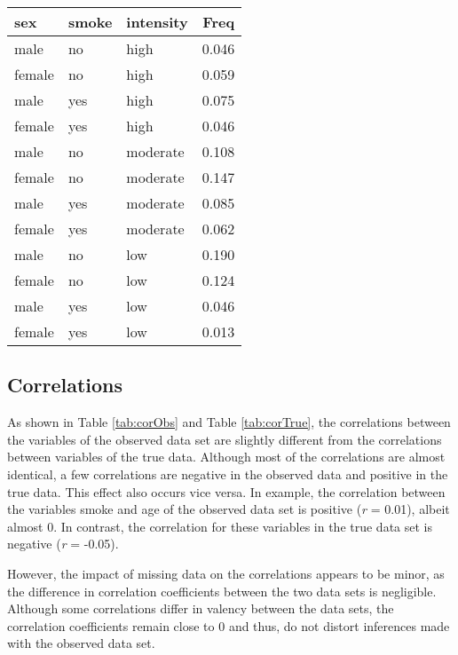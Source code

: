 \documentclass[
]{article}
\begin{document}
\begin{table}
\begin{table}
\centering
\begin{tabular}[t]{l|l|l|r}
\hline
sex & smoke & intensity & Freq\\
\hline
male & no & high & 0.046\\
\hline
female & no & high & 0.059\\
\hline
male & yes & high & 0.075\\
\hline
female & yes & high & 0.046\\
\hline
male & no & moderate & 0.108\\
\hline
female & no & moderate & 0.147\\
\hline
male & yes & moderate & 0.085\\
\hline
female & yes & moderate & 0.062\\
\hline
male & no & low & 0.190\\
\hline
female & no & low & 0.124\\
\hline
male & yes & low & 0.046\\
\hline
female & yes & low & 0.013\\
\hline
\end{tabular}
\end{table}
\end{table}

\hypertarget{data3}{%
\subsection{Correlations}\label{data3}}

As shown in Table \ref{tab:corObs} and Table \ref{tab:corTrue}, the correlations between the variables of the observed data set are slightly different from the correlations between variables of the true data. Although most of the correlations are almost identical, a few correlations are negative in the observed data and positive in the true data. This effect also occurs vice versa. In example, the correlation between the variables smoke and age of the observed data set is positive (\emph{r} = 0.01), albeit almost 0. In contrast, the correlation for these variables in the true data set is negative (\emph{r} = -0.05).

However, the impact of missing data on the correlations appears to be minor, as the difference in correlation coefficients between the two data sets is negligible. Although some correlations differ in valency between the data sets, the correlation coefficients remain close to 0 and thus, do not distort inferences made with the observed data set.
\end{document}

